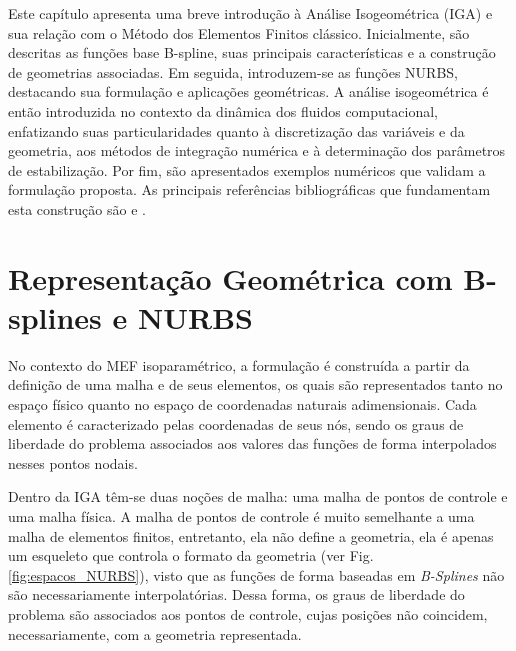 \documentclass[tese_patricia]{subfiles}
\begin{document}
Este capítulo apresenta uma breve introdução à Análise Isogeométrica (IGA) e sua relação com o Método dos Elementos Finitos clássico. Inicialmente, são descritas as funções base B-spline, suas principais características e a construção de geometrias associadas. Em seguida, introduzem-se as funções NURBS, destacando sua formulação e aplicações geométricas. A análise isogeométrica é então introduzida no contexto da dinâmica dos fluidos computacional, enfatizando suas particularidades quanto à discretização das variáveis e da geometria, aos métodos de integração numérica e à determinação dos parâmetros de estabilização. Por fim, são apresentados exemplos numéricos que validam a formulação proposta. As principais referências bibliográficas que fundamentam esta construção são  e . 


\section{Representação Geométrica com B-splines e NURBS}

No contexto do MEF isoparamétrico, a formulação é construída a partir da definição de uma malha e de seus elementos, os quais são representados tanto no espaço físico quanto no espaço de coordenadas naturais adimensionais.  Cada elemento é caracterizado pelas coordenadas de seus nós, sendo os graus de liberdade do problema associados aos valores das funções de forma interpolados nesses pontos nodais.

Dentro da IGA têm-se duas noções de malha: uma malha de pontos de controle e uma malha física. A malha de pontos de controle é muito semelhante a uma malha de elementos finitos, entretanto, ela não define a geometria, ela é apenas um esqueleto que controla o formato da geometria (ver Fig. \ref{fig:espacos_NURBS}), visto que as funções de forma baseadas em \textit{B-Splines} não são necessariamente interpolatórias. Dessa forma, os graus de liberdade do problema são associados aos pontos de controle, cujas posições não coincidem, necessariamente, com a geometria representada.
\end{document}
